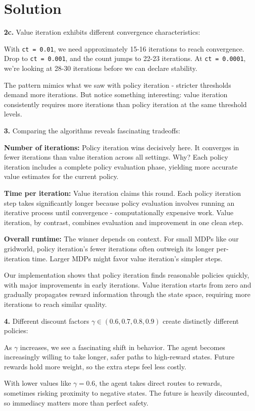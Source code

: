 \documentclass[submit]{../harvardml}
\newenvironment{solution}
  {\color{blue}\section*{Solution}}
{}
\begin{document}
\begin{solution}
\textbf{2c.} Value iteration exhibits different convergence characteristics:

With \texttt{ct = 0.01}, we need approximately 15-16 iterations to reach convergence. Drop to \texttt{ct = 0.001}, and the count jumps to 22-23 iterations. At \texttt{ct = 0.0001}, we're looking at 28-30 iterations before we can declare stability.

The pattern mimics what we saw with policy iteration - stricter thresholds demand more iterations. But notice something interesting: value iteration consistently requires more iterations than policy iteration at the same threshold levels.

\textbf{3.} Comparing the algorithms reveals fascinating tradeoffs:

\textbf{Number of iterations:} Policy iteration wins decisively here. It converges in fewer iterations than value iteration across all settings. Why? Each policy iteration includes a complete policy evaluation phase, yielding more accurate value estimates for the current policy.

\textbf{Time per iteration:} Value iteration claims this round. Each policy iteration step takes significantly longer because policy evaluation involves running an iterative process until convergence - computationally expensive work. Value iteration, by contrast, combines evaluation and improvement in one clean step.

\textbf{Overall runtime:} The winner depends on context. For small MDPs like our gridworld, policy iteration's fewer iterations often outweigh its longer per-iteration time. Larger MDPs might favor value iteration's simpler steps.

Our implementation shows that policy iteration finds reasonable policies quickly, with major improvements in early iterations. Value iteration starts from zero and gradually propagates reward information through the state space, requiring more iterations to reach similar quality.

\textbf{4.} Different discount factors $\gamma \in (0.6, 0.7, 0.8, 0.9)$ create distinctly different policies:

As $\gamma$ increases, we see a fascinating shift in behavior. The agent becomes increasingly willing to take longer, safer paths to high-reward states. Future rewards hold more weight, so the extra steps feel less costly.

With lower values like $\gamma = 0.6$, the agent takes direct routes to rewards, sometimes risking proximity to negative states. The future is heavily discounted, so immediacy matters more than perfect safety.


\end{solution}
\end{document}
